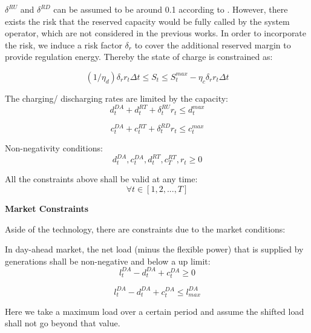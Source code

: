  $\delta^{RU}$ and $\delta^{RD}$ can be assumed to be around 0.1 according to \cite{Berrada2016} \cite{Byrne2012}. However, there exists the risk that the reserved capacity would be fully called by the system operator, which are not considered in the previous works. In order to incorporate the risk, we induce a risk factor $\delta_r$ to cover the additional reserved margin to provide regulation energy. Thereby the state of charge is constrained as:
 
\begin{equation}
\label{eq:limit-state}
	(1/\eta_d)\delta_r r_t \Delta t \leq S_t \leq S_t^{max} - \eta_c\delta_r r_t \Delta t
\end{equation}

The charging/ discharging rates are limited by the capacity:
\begin{equation}
\label{eq:limit-discharge-rate}
d_t^{DA} + d_t^{RT} +\delta^{RU}_t r_t \leq d_t^{max}
\end{equation}

\begin{equation}
\label{eq:limit-charge-rate}
c_t^{DA} + c_t^{RT} +\delta^{RD}_t r_t \leq c_t^{max}
\end{equation}

Non-negativity conditions:
\begin{equation}
d_t^{DA}, c_t^{DA}, d_t^{RT}, c_T^{RT}, r_t \geq 0
\end{equation}

All the constraints above shall be valid at any time:
\begin{equation*}
\forall t \in [1, 2, ..., T]
\end{equation*}

\textbf{Market Constraints}

Aside of the technology, there are constraints due to the market conditions:

In day-ahead market, the net load (minus the flexible power) that is supplied by generations shall be non-negative and below a up limit:
\begin{equation}
\label{eq:market-da-low}
l_t^{DA} - d_t^{DA} + c_t^{DA} \geq 0
\end{equation}

\begin{equation}
\label{eq:market-da-high}
l_t^{DA} - d_t^{DA} + c_t^{DA} \leq l_{max}^{DA}
\end{equation}

Here we take a maximum load over a certain period and assume the shifted load shall not go beyond that value.

